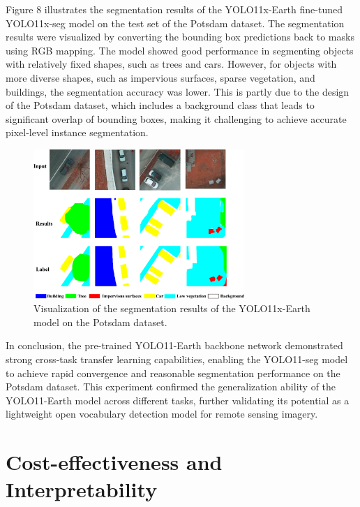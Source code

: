 \documentclass{article}
\begin{document}
Figure 8 illustrates the segmentation results of the YOLO11x-Earth fine-tuned YOLO11x-seg model on the test set of the Potsdam dataset. The segmentation results were visualized by converting the bounding box predictions back to masks using RGB mapping. The model showed good performance in segmenting objects with relatively fixed shapes, such as trees and cars. However, for objects with more diverse shapes, such as impervious surfaces, sparse vegetation, and buildings, the segmentation accuracy was lower. This is partly due to the design of the Potsdam dataset, which includes a background class that leads to significant overlap of bounding boxes, making it challenging to achieve accurate pixel-level instance segmentation.
\begin{figure}[htbp]
    \centering
    \includegraphics[width=8cm]{../image/8.png}
    \caption{Visualization of the segmentation results of the YOLO11x-Earth model on the Potsdam dataset.}
    \label{fig:segmentation-results}
\end{figure}
In conclusion, the pre-trained YOLO11-Earth backbone network demonstrated strong cross-task transfer learning 
capabilities, enabling the YOLO11-seg model to achieve rapid convergence and reasonable segmentation performance 
on the Potsdam dataset. This experiment confirmed the generalization ability of the YOLO11-Earth model across 
different tasks, further validating its potential as a lightweight open vocabulary detection model for remote 
sensing imagery.

\section{Cost-effectiveness and Interpretability}
\end{document}
